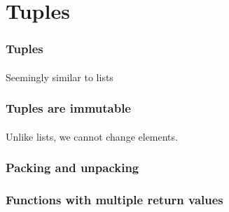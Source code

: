 \section{Tuples} %
\label{sec:tuples}

\begin{frame}\frametitle{Tuples}
    \framesubtitle{}

    Seemingly similar to lists

    \vfill


\end{frame}

\begin{frame}\frametitle{Tuples are immutable}
    \framesubtitle{}

    Unlike lists, we cannot change elements.


\end{frame}

\begin{frame}\frametitle{Packing and unpacking}
    \framesubtitle{}


\end{frame}

\begin{frame}\frametitle{Functions with multiple return values}
    \framesubtitle{}


\end{frame}


